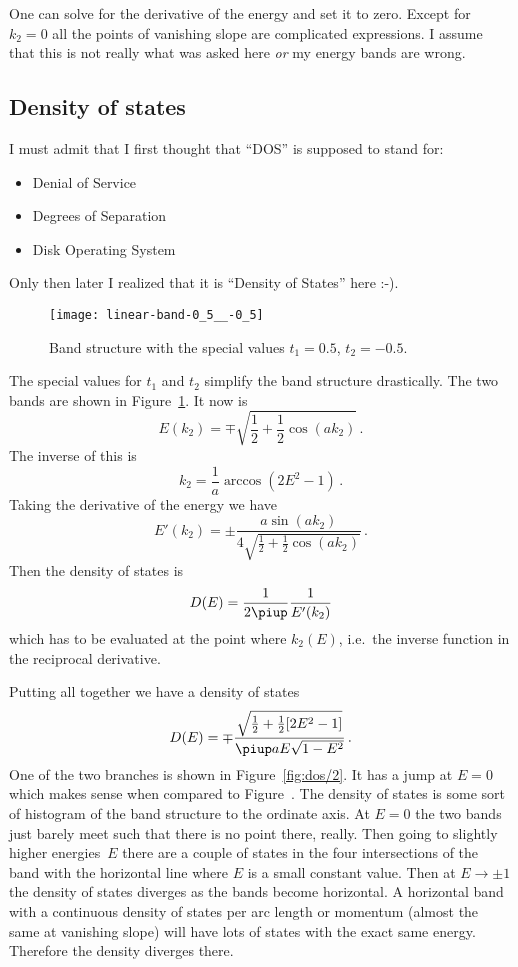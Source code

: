 \documentclass[11pt, english, fleqn, DIV=15, headinclude, BCOR=1cm]{scrartcl}
\begin{document}
One can solve for the derivative of the energy and set it to zero. Except for
$k_2 = 0$ all the points of vanishing slope are complicated expressions. I
assume that this is not really what was asked here \emph{or} my energy bands
are wrong.

\subsection{Density of states}

I must admit that I first thought that “DOS” is supposed to stand for:

\begin{itemize}
    \item Denial of Service
    \item Degrees of Separation
    \item Disk Operating System
\end{itemize}

Only then later I realized that it is “Density of States” here :-).

\begin{figure}
    \centering
    \texttt{[image: linear-band-0\_5\_\_-0\_5]}
    \caption{%
        Band structure with the special values $t_1 = \num{0.5}$, $t_2 =
        \num{-0.5}$.
    }
    \label{fig:band-3}
\end{figure}

The special values for $t_1$ and $t_2$ simplify the band structure drastically.
The two bands are shown in Figure~\ref{fig:band-3}. It now is
\[
    E(k_2) = \mp \sqrt{\frac 12 + \frac 12 \cos(a k_2)} \,.
\]
The inverse of this is
\[
    k_2 = \frac 1a \arccos(2 E^2 - 1) \,.
\]
Taking the derivative of the energy we have
\[
    E'(k_2) = \pm \frac{a \sin(a k_2)}{4 \sqrt{\frac 12 + \frac 12 \cos(a
    k_2)}} \,.
\]
Then the density of states is
\[
    D(E) = \frac{1}{2 \piup} \frac{1}{E'(k_2)}
\]
which has to be evaluated at the point where $k_2(E)$, i.e.\ the inverse
function in the reciprocal derivative.

Putting all together we have a density of states
\[
    D(E) = \mp \frac{\sqrt{\frac 12 + \frac 12 [2 E^2 - 1]}}{\piup a E \sqrt{1 -
    E^2}} \,.
\]
One of the two branches is shown in Figure~\ref{fig:dos/2}. It has a jump at $E
= 0$ which makes sense when compared to Figure~\label{fig:band-3}. The density
of states is some sort of histogram of the band structure to the ordinate axis.
At $E = 0$ the two bands just barely meet such that there is no point there,
really. Then going to slightly higher energies~$E$ there are a couple of states
in the four intersections of the band with the horizontal line where $E$ is a
small constant value. Then at $E \to \pm 1$ the density of states diverges as
the bands become horizontal. A horizontal band with a continuous density of
states per arc length or momentum (almost the same at vanishing slope) will
have lots of states with the exact same energy. Therefore the density diverges
there.
\end{document}

